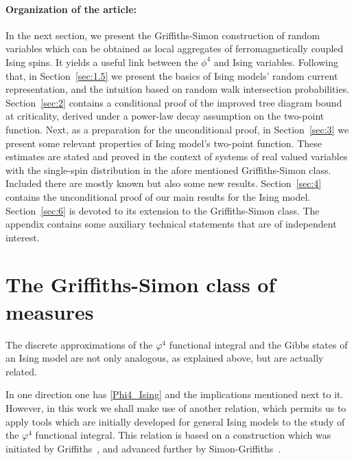 \documentclass[a4paper,oneside,11pt]{article}
\numberwithin{equation}{section}
\numberwithin{equation}{section}
\numberwithin{equation}{section}
\begin{document}
 \paragraph{Organization of the article:}  In the next section, we present the Griffiths-Simon construction of random variables which can be obtained as local aggregates of ferromagnetically coupled Ising spins.  It yields a  useful  link  between the $\phi^4$ and Ising variables.
 Following that, in Section~\ref{sec:1.5} we present the basics of Ising models' random current representation, and  the intuition based on random walk intersection probabilities.   Section~\ref{sec:2} contains a conditional proof of the improved tree diagram bound at criticality,  derived under a  power-law decay assumption on the two-point function.   Next, as a preparation for the unconditional proof, in Section~\ref{sec:3} we present some relevant properties of Ising model's two-point function. These estimates are stated and proved in the context of systems of real valued variables with the single-spin distribution in the afore mentioned Griffiths-Simon class. Included there are mostly known but also some new results.   Section~\ref{sec:4} contains the unconditional proof of our main results for the Ising model.  Section~\ref{sec:6} is devoted to its extension to the Griffiths-Simon class.   The appendix contains some auxiliary technical statements that are of independent interest.
  
\section{The Griffiths-Simon class of measures} \label{sec:GS}

The discrete approximations of the $\varphi^4$ functional integral and the Gibbs states of an Ising model are not only  analogous, as explained above, but are actually related.    

In one direction one has  \eqref{Phi4_Ising} and the implications mentioned next to it.  However, in this work we shall make use of another relation, which permits us to apply tools which are initially developed for general Ising models to the study of the $\varphi^4$ functional integral.    This relation is based on a construction which was initiated by  Griffiths~\cite{Gri69}, and advanced further by Simon-Griffiths~\cite{SimGri73}.     
\end{document}
